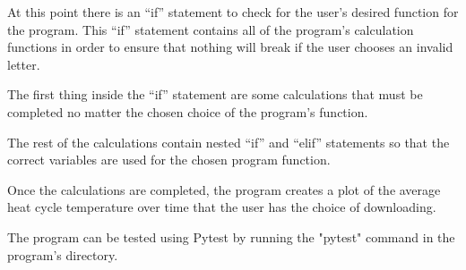\documentclass[a4paper,12pt]{article}
\begin{document}
\medskip

At this point there is an “if” statement to check for the user’s desired function for the program.  This “if” statement contains all of the program’s calculation functions in order to ensure that nothing will break if the user chooses an invalid letter.

\medskip

The first thing inside the “if” statement are some calculations that must be completed no matter the chosen choice of the program’s function. 

\medskip

The rest of the calculations contain nested “if” and “elif” statements so that the correct variables are used for the chosen program function.

\medskip

Once the calculations are completed, the program creates a plot of the average heat cycle temperature over time that the user has the choice of downloading.

\medskip

The program can be tested using Pytest by running the "pytest" command in the program's directory.
\end{document}
